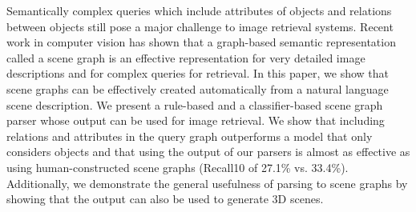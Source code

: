 Semantically complex queries which include attributes of objects and relations between objects still pose a major challenge to image retrieval systems. Recent work in computer vision has shown that a graph-based semantic representation called a scene graph is an effective representation for very detailed image descriptions and for complex queries for retrieval. In this paper, we show that scene graphs can be effectively created automatically from a natural language scene description. We present a rule-based and a classifier-based scene graph parser whose output can be used for image retrieval. We show that including relations and attributes in the query graph outperforms a model that only considers objects and that using the output of our parsers is almost as effective as using human-constructed scene graphs (Recall\@10 of 27.1\% vs. 33.4\%). Additionally, we demonstrate the general usefulness of parsing to scene graphs by showing that the output can also be used to generate 3D scenes.
